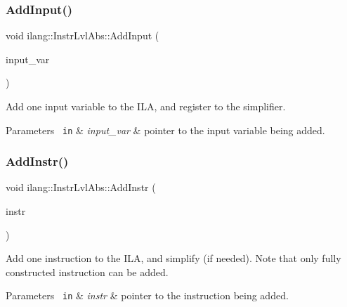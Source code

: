 \subsubsection{\texorpdfstring{Add\+Input()}{AddInput()}}
{\footnotesize\ttfamily void ilang\+::\+Instr\+Lvl\+Abs\+::\+Add\+Input (\begin{DoxyParamCaption}\item[{const \mbox{\hyperlink{namespaceilang_a7c4196c72e53ea4df4b7861af7bc3bce}{Expr\+Ptr}}}]{input\+\_\+var }\end{DoxyParamCaption})}



Add one input variable to the I\+LA, and register to the simplifier. 


\begin{DoxyParams}[1]{Parameters}
\mbox{\texttt{ in}}  & {\em input\+\_\+var} & pointer to the input variable being added. \\
\hline
\end{DoxyParams}
\mbox{\label{classilang_1_1_instr_lvl_abs_aec2db39a4da59de361ed2d5bedc6153c}} 
\subsubsection{\texorpdfstring{Add\+Instr()}{AddInstr()}}
{\footnotesize\ttfamily void ilang\+::\+Instr\+Lvl\+Abs\+::\+Add\+Instr (\begin{DoxyParamCaption}\item[{const \mbox{\hyperlink{namespaceilang_af88a19312ae653d687a0d1207bb284f6}{Instr\+Ptr}}}]{instr }\end{DoxyParamCaption})}



Add one instruction to the I\+LA, and simplify (if needed). Note that only fully constructed instruction can be added. 


\begin{DoxyParams}[1]{Parameters}
\mbox{\texttt{ in}}  & {\em instr} & pointer to the instruction being added. \\
\hline
\end{DoxyParams}
\mbox{\label{classilang_1_1_instr_lvl_abs_a16aac64c463f751d34f38986ad60b0f1}} 
